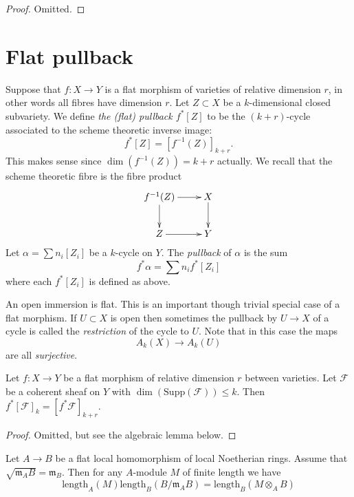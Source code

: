 \begin{proof}
Omitted.
\end{proof}












\section{Flat pullback}
\label{section-flat-pullback}

\noindent
Suppose that $f : X \to Y$ is a flat morphism
of varieties of relative dimension $r$,
in other words all fibres have dimension $r$.
Let $Z \subset X$ be a $k$-dimensional closed subvariety. We define
{\it the (flat) pullback $f^*[Z]$} to be the
$(k+r)$-cycle associated to the scheme theoretic inverse image:
$$
f^*[Z] = [f^{-1}(Z)]_{k+r}.
$$
This makes sense since $\dim(f^{-1}(Z)) = k + r$ actually.
We recall that the scheme theoretic fibre is the fibre product
$$
\xymatrix{
f^{-1}(Z) \ar[r] \ar[d] & X \ar[d] \\
Z \ar[r] & Y
}
$$
Let $\alpha = \sum n_i [Z_i]$ be
a $k$-cycle on $Y$. The {\it pullback} of $\alpha$ is the sum
$$
f^* \alpha = \sum n_i f^*[Z_i]
$$
where each $f^*[Z_i]$ is defined as above.

\begin{remark}
\label{remark-open-immersion-flat}
An open immersion is flat. This is an important though trivial special
case of a flat morphism. If $U \subset X$ is open then sometimes the
pullback by $U \to X$ of a cycle is called the {\it restriction} of the
cycle to $U$. Note that in this case the maps
$$
A_k(X) \longrightarrow A_k(U)
$$
are all {\it surjective}.
\end{remark}

\begin{lemma}
\label{lemma-pullback-coherent}
Let $f : X \to Y$ be a flat morphism of relative dimension $r$ between
varieties. Let $\mathcal{F}$ be a coherent sheaf on $Y$ with
$\dim(\text{Supp}(\mathcal{F})) \leq k$.
Then $f^*[{\mathcal F}]_k = [f^*{\mathcal F}]_{k+r}$.
\end{lemma}

\begin{proof}
Omitted, but see the algebraic lemma below.
\end{proof}

\begin{lemma}
\label{lemma-pullback-coherent-algebra}
Let $A \to B$ be a flat local homomorphism of local Noetherian rings.
Assume that $\sqrt{\mathfrak m_A B} = \mathfrak m_B$.
Then for any $A$-module $M$ of finite length we have
$$
\text{length}_A(M) \text{length}_B(B/\mathfrak m_AB)
= \text{length}_B(M \otimes_A B)
$$
\end{lemma}

